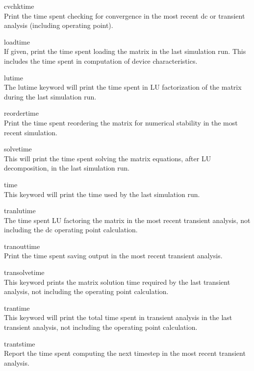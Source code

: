 \begin{description}
\item{\vt cvchktime}\\
Print the time spent checking for convergence in the most recent dc or
transient analysis (including operating point).

\item{\vt loadtime}\\
If given, print the time spent loading the matrix in the last
simulation run.  This includes the time spent in computation of device
characteristics.

\item{\vt lutime}\\
The {\vt lutime} keyword will print the time spent in LU factorization
of the matrix during the last simulation run.

\item{\vt reordertime}\\
Print the time spent reordering the matrix for numerical stability in
the most recent simulation.

\item{\vt solvetime}\\
This will print the time spent solving the matrix equations, after
LU decomposition, in the last simulation run.

\item{\vt time}\\
This keyword will print the time used by the last simulation run.

\item{\vt tranlutime}\\
The time spent LU factoring the matrix in the most recent transient
analysis, not including the dc operating point calculation.

\item{\vt tranouttime}\\
Print the time spent saving output in the most recent transient
analysis.

\item{\vt transolvetime}\\
This keyword prints the matrix solution time required by the last
transient analysis, not including the operating point calculation.

\item{\vt trantime}\\
This keyword will print the total time spent in transient analysis
in the last transient analysis, not including the operating point
calculation.

\item{\vt trantstime}\\
Report the time spent computing the next timestep in the most recent
transient analysis.
\end{description}

